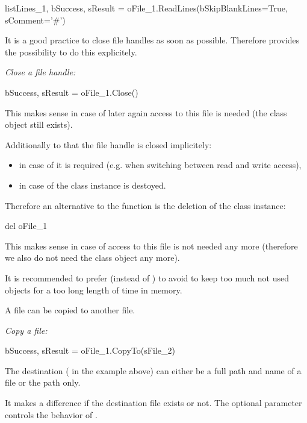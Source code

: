 \begin{pythoncode}
listLines_1, bSuccess, sResult = oFile_1.ReadLines(bSkipBlankLines=True,
                                                   sComment='#')
\end{pythoncode}

It is a good practice to close file handles as soon as possible. Therefore  provides the possibility to do this explicitely.

\textit{Close a file handle:}

\begin{pythoncode}
bSuccess, sResult = oFile_1.Close()
\end{pythoncode}

This makes sense in case of later again access to this file is needed (the class object  still exists).

Additionally to that the file handle is closed implicitely:

\begin{itemize}
   \item in case of it is required (e.g. when switching between read and write access),
   \item in case of the class instance is destoyed.
\end{itemize}

Therefore an alternative to the  function is the deletion of the class instance:

\begin{pythoncode}
del oFile_1
\end{pythoncode}

This makes sense in case of access to this file is not needed any more (therefore we also do not need the class object any more).

It is recommended to prefer  (instead of ) to avoid to keep too much not used objects for a too long length of time in memory.

A file can be copied to another file.

\textit{Copy a file:}

\begin{pythoncode}
bSuccess, sResult = oFile_1.CopyTo(sFile_2)
\end{pythoncode}

The destination ( in the example above) can either be a full path and name of a file or the path only.

It makes a difference if the destination file exists or not. The optional parameter  controls the behavior of .

